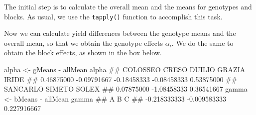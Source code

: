 \documentclass[a4paper,12pt,oneside]{book}
\newenvironment{Shaded}{\begin{snugshade}}{\end{snugshade}}
\newcommand{\SpecialCharTok}[1]{#1}
\newcommand{\DocumentationTok}[1]{#1}
\newcommand{\OtherTok}[1]{#1}
\newcommand{\FunctionTok}[1]{#1}
\newcommand{\NormalTok}[1]{#1}
\begin{document}
The initial step is to calculate the overall mean and the means for genotypes and blocks. As usual, we use the \texttt{tapply()} function to accomplish this task.

\vspace{12pt}

\begin{Shaded}
\end{Shaded}

Now we can calculate yield differences between the genotype means and the overall mean, so that we obtain the genotype effects \(\alpha_i\). We do the same to obtain the block effects, as shown in the box below.

\vspace{12pt}

\begin{Shaded}
\begin{Highlighting}[]
\NormalTok{alpha }\OtherTok{\textless{}{-}}\NormalTok{ gMeans }\SpecialCharTok{{-}}\NormalTok{ allMean}
\NormalTok{alpha}
\DocumentationTok{\#\#    COLOSSEO       CRESO      DUILIO      GRAZIA       IRIDE }
\DocumentationTok{\#\#  0.46875000 {-}0.09791667 {-}0.18458333 {-}0.08458333  0.53875000 }
\DocumentationTok{\#\#    SANCARLO      SIMETO       SOLEX }
\DocumentationTok{\#\#  0.07875000 {-}1.08458333  0.36541667}
\NormalTok{gamma }\OtherTok{\textless{}{-}}\NormalTok{ bMeans }\SpecialCharTok{{-}}\NormalTok{ allMean}
\NormalTok{gamma}
\DocumentationTok{\#\#            A            B            C }
\DocumentationTok{\#\# {-}0.218333333 {-}0.009583333  0.227916667}
\end{Highlighting}
\end{Shaded}
\end{document}
